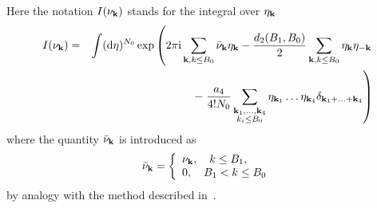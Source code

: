 Here the notation $I(\nu_{\vb k})$ stands for the integral over $\eta_{\vb k}$
\begin{eqnarray*}
	I(\nu_{\vb k}) & = & \int ({\rm d} \eta)^{N_0} \exp
	\left( 2\pi{\rm i} \sum_{\vb k, k \leq B_0} \bar{\nu}_{\vb k} \eta_{\vb k} - \frac{d_2(B_1, B_0)}{2} \sum_{\vb k, k \leq B_0} \eta_{\vb k} \eta_{-\vb k}
	\right.
	\\
	&& - \left. \frac{a_4}{4! N_0} \sum_{\substack{\vb k_1, \dotsc, \vb k_4 \\ k_i \leq B_0}} \eta_{\vb k_1} \dotsc \eta_{\vb k_4} \delta_{\vb{k}_1 + \dotsc + \vb{k}_4} \right)
\end{eqnarray*}
where the quantity $\bar{\nu}_{\vb k}$ is introduced as
\begin{equation*}
	\bar{\nu}_{\vb k} = \left\{
	\begin{array}{ll}
		\nu_{\vb k}, \quad k \leq B_1, \\
		0, \quad B_1 < k \leq B_0
	\end{array}
	\right.
\end{equation*}
by analogy with the method described in~\cite{MpkCMP2005}.


